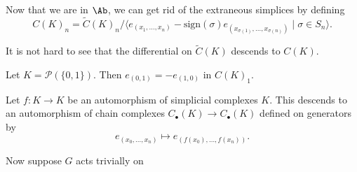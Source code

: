 \documentclass[main.tex]{subfiles}
\begin{document}
Now that we are in $\Ab$, we can get rid of the extraneous simplices by defining
\begin{equation*}
  C(K)_{n} = \widetilde{C}(K)_{n}/\langle e_{(x_{1}, \ldots, x_{n})} - \mathrm{sign}(\sigma) e_{(x_{\sigma(1)}, \ldots, x_{\sigma(n)})} \mid \sigma \in S_{n}\rangle.
\end{equation*}

It is not hard to see that the differential on $\widetilde{C}(K)$ descends to $C(K)$.

\begin{example}
  Let $K = \mathcal{P}(\{0, 1\})$. Then $e_{(0, 1)} = -e_{(1, 0)}$ in $C(K)_{1}$.
\end{example}

Let $f\colon K \to K$ be an automorphism of simplicial complexes $K$. This descends to an automorphism of chain complexes $C_{\bullet}(K) \to C_{\bullet}(K)$ defined on generators by
\begin{equation*}
  e_{(x_{0}, \ldots, x_{n})} \mapsto e_{(f(x_{0}), \ldots, f(x_{n}))}.
\end{equation*}

Now suppose $G$ acts trivially on
\end{document}
